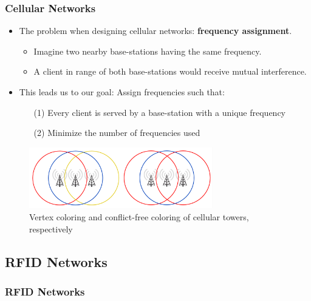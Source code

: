 \documentclass[xcolor=dvipsnames,aspectratio=1610]{beamer}
\begin{document}
  \begin{frame}
    \frametitle{Cellular Networks}

    \begin{itemize}
      \item The problem when designing cellular networks: \textbf{frequency assignment}.
      \begin{itemize}
        \item Imagine two nearby base-stations having the same frequency.
        \item A client in range of both base-stations would receive mutual interference.
      \end{itemize}
    \end{itemize}

    \pause
    \vspace{-0.2cm}

    \begin{itemize}
      \item This leads us to our goal: Assign frequencies such that:
      \pause
      \begin{itemize}
        \item[(1)] Every client is served by a base-station with a unique frequency
        \pause
        \item[(2)] Minimize the number of frequencies used
      \end{itemize}
    \end{itemize}

    \pause
    \vfill

    \begin{figure}[h]
      \centering
      \includegraphics[width=8cm,trim=4 4 4 4,clip]{../figures/towers.pdf}
      \caption{Vertex coloring and conflict-free coloring of cellular towers, respectively}
    \end{figure}

  \end{frame}

  \subsection{RFID Networks}

  \begin{frame}
    \frametitle{RFID Networks}
  \end{frame}
\end{document}
